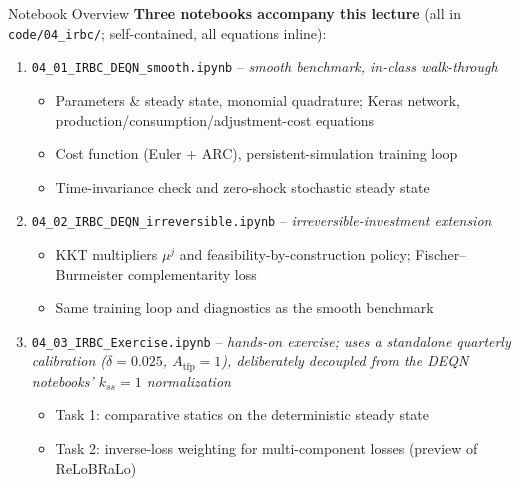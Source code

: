 \documentclass[aspectratio=169,11pt]{beamer}
\begin{document}
\begin{frame}{Notebook Overview}
\footnotesize
\textbf{Three notebooks accompany this lecture} (all in \texttt{code/04\_irbc/}; self-contained, all equations inline):

\vspace{0.2em}
\begin{enumerate}\itemsep1pt
    \item \texttt{04\_01\_IRBC\_DEQN\_smooth.ipynb} -- \emph{smooth benchmark, in-class walk-through}
    \begin{itemize}\itemsep0pt
        \item Parameters \& steady state, monomial quadrature; Keras network, production/consumption/adjustment-cost equations
        \item Cost function (Euler + ARC), persistent-simulation training loop
        \item Time-invariance check and zero-shock stochastic steady state
    \end{itemize}

    \item \texttt{04\_02\_IRBC\_DEQN\_irreversible.ipynb} -- \emph{irreversible-investment extension}
    \begin{itemize}\itemsep0pt
        \item KKT multipliers $\mu^j$ and feasibility-by-construction policy; Fischer--Burmeister complementarity loss
        \item Same training loop and diagnostics as the smooth benchmark
    \end{itemize}

    \item \texttt{04\_03\_IRBC\_Exercise.ipynb} -- \emph{hands-on exercise; uses a \emph{standalone} quarterly calibration ($\delta=0.025$, $A_{\mathrm{tfp}}=1$), deliberately decoupled from the DEQN notebooks' $k_{ss}=1$ normalization}
    \begin{itemize}\itemsep0pt
        \item Task 1: comparative statics on the deterministic steady state
        \item Task 2: inverse-loss weighting for multi-component losses (preview of ReLoBRaLo)
    \end{itemize}
\end{enumerate}
\end{frame}
\end{document}
